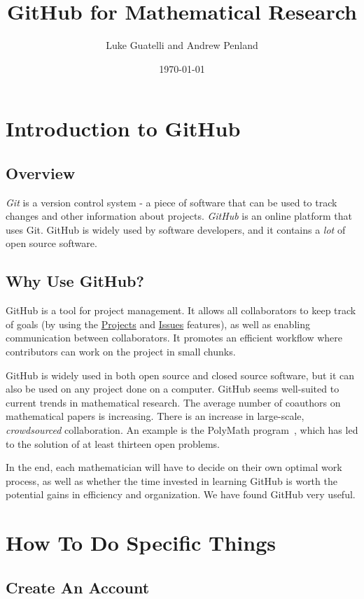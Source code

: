 \documentclass[11pt]{article}
\title{GitHub for Mathematical Research}
\author{Luke Guatelli and Andrew Penland}
\date{\today}
\begin{document}
\maketitle

\section{Introduction to GitHub}

\subsection{Overview}

\textit{Git} is a version control system - a piece of software that can be used to track changes and other information about projects. \textit{GitHub} is an online platform that uses Git. GitHub is widely used by software developers, and it contains a \textit{lot} of open source software. 

\subsection{Why Use GitHub?}

GitHub is a tool for project management. It allows all collaborators to keep track of goals (by using the \hyperlink{proj-section}{Projects} and \hyperlink{issues-section}{Issues} features), as well as enabling communication between collaborators. It promotes an efficient workflow where contributors can work on the project in small chunks.

GitHub is widely used in both open source and closed source software, but it can also be used on any project done on a computer.  GitHub seems well-suited to current trends in mathematical research. The average number of coauthors on mathematical papers is increasing. There is an increase in large-scale, \textit{crowdsourced} collaboration. An example is the PolyMath program~\cite{polymath-blog}, which has led to the solution of at least thirteen open problems. 

In the end, each mathematician will have to decide on their own optimal work process, as well as whether the time invested in learning GitHub is worth the potential gains in efficiency and organization. We have found GitHub very useful.

\section{How To Do Specific Things}
\subsection{Create An Account}
\end{document}
